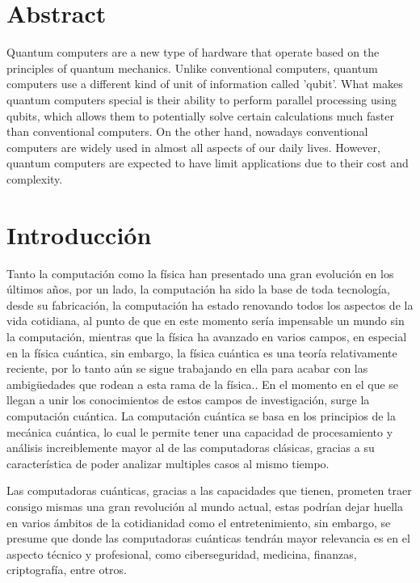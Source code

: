 \documentclass[twoside]{article}
\author{Adrián José Villalobos Peraza\
Institución 1 \and Maikol Gabriel Flores Madrigal\
Institución 2 \and Isaac Ramírez Rojas\
Institución 3}
\begin{document}


\tableofcontents


\newpage
\section{Abstract}
Quantum computers are a new type of hardware that operate based on the principles of quantum mechanics. Unlike conventional computers, quantum computers use a different kind of unit of information called 'qubit'. What makes quantum computers special is their ability to perform parallel processing using qubits, which allows them to potentially solve certain calculations much faster than conventional computers. On the other hand, nowadays conventional computers are widely used in almost all aspects of our daily lives. However, quantum computers are expected to have limit applications due to their cost and complexity.  

\newpage

\section{Introducción}
Tanto la computación como la física han presentado una gran evolución en los últimos años, por un lado, la computación ha sido la base de toda tecnología, desde su fabricación, la computación ha estado renovando todos los aspectos de la vida cotidiana, al punto de que en este momento sería impensable un mundo sin la computación, mientras que la física ha avanzado en varios campos, en especial en la física cuántica, sin embargo, la física cuántica es una teoría relativamente reciente, por lo tanto aún se sigue trabajando en ella para acabar con las ambigüedades que rodean a esta rama de la física.. En el momento en el que se llegan a unir los conocimientos de estos campos de investigación, surge la computación cuántica. La computación cuántica se basa en los principios de la mecánica cuántica, lo cual le permite tener una capacidad de procesamiento y análisis increiblemente mayor al de las computadoras clásicas, gracias a su característica de poder analizar multiples casos al mismo tiempo.

Las computadoras cuánticas, gracias a las capacidades que tienen, prometen traer consigo mismas una gran revolución al mundo actual, estas podrían dejar huella en varios ámbitos de la cotidianidad como el entretenimiento, sin embargo, se presume que donde las computadoras cuánticas tendrán mayor relevancia es en el aspecto técnico y profesional, como ciberseguridad, medicina, finanzas, criptografía, entre otros.
\end{document}
